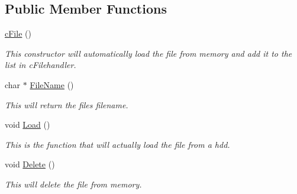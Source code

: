 \subsection*{Public Member Functions}
\begin{DoxyCompactItemize}
\item 
\hypertarget{classc_file_a5bb81f36e954af61b581e3c1fd06e0de}{
\hyperlink{classc_file_a5bb81f36e954af61b581e3c1fd06e0de}{cFile} ()}
\label{classc_file_a5bb81f36e954af61b581e3c1fd06e0de}

\begin{DoxyCompactList}\small\item\em This constructor will automatically load the file from memory and add it to the list in cFilehandler. \end{DoxyCompactList}\item 
\hypertarget{classc_file_a7224559b2485e53608bd6ba9e21d1122}{
char $\ast$ \hyperlink{classc_file_a7224559b2485e53608bd6ba9e21d1122}{FileName} ()}
\label{classc_file_a7224559b2485e53608bd6ba9e21d1122}

\begin{DoxyCompactList}\small\item\em This will return the files filename. \end{DoxyCompactList}\item 
\hypertarget{classc_file_aa5891f6208183a26e7fde7d8dee62ffc}{
void \hyperlink{classc_file_aa5891f6208183a26e7fde7d8dee62ffc}{Load} ()}
\label{classc_file_aa5891f6208183a26e7fde7d8dee62ffc}

\begin{DoxyCompactList}\small\item\em This is the function that will actually load the file from a hdd. \end{DoxyCompactList}\item 
\hypertarget{classc_file_ab2e74ccc027ccb92ea577cd7bb9b5f5c}{
void \hyperlink{classc_file_ab2e74ccc027ccb92ea577cd7bb9b5f5c}{Delete} ()}
\label{classc_file_ab2e74ccc027ccb92ea577cd7bb9b5f5c}

\begin{DoxyCompactList}\small\item\em This will delete the file from memory. \end{DoxyCompactList}\end{DoxyCompactItemize}
